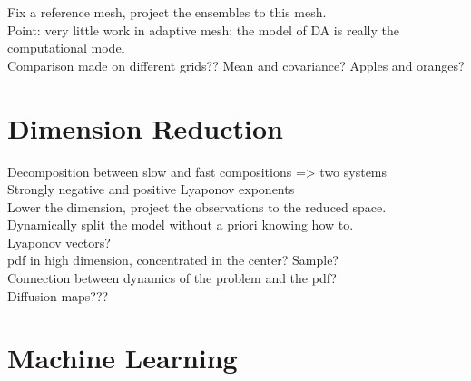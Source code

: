 \documentclass[10pt,a4paper]{article}
\begin{document}
Fix a reference mesh, project the ensembles to this mesh.\\

Point: very little work in adaptive mesh; the model of DA is really the computational model\\

Comparison made on different grids?? Mean and covariance? Apples and oranges?\\

\section{Dimension Reduction}
Decomposition between slow and fast compositions => two systems\\
Strongly negative and positive Lyaponov exponents\\

Lower the dimension, project the observations to the reduced space.\\

Dynamically split the model without a priori knowing how to.\\

Lyaponov vectors?\\

pdf in high dimension, concentrated in the center? Sample? \\

Connection between dynamics of the problem and the pdf?\\

Diffusion maps???\\

\section{Machine Learning}
\end{document}
